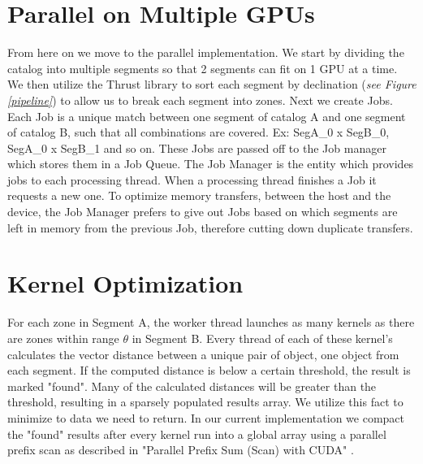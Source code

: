 \section{Parallel on Multiple GPUs}
From here on we move to the parallel implementation. We start by dividing the catalog into multiple segments so that 2 segments can fit on 1 GPU at a time. We then utilize the Thrust library to sort each segment by declination (\textit{see Figure \ref{pipeline}}) to allow us to break each segment into zones. Next we create Jobs. Each Job is a unique match between one segment of catalog A and one segment of catalog B, such that all combinations are covered. Ex: SegA\_0 x SegB\_0, SegA\_0 x SegB\_1 and so on. These Jobs are passed off to the Job manager which stores them in a Job Queue. The Job Manager is the entity which provides jobs to each processing thread. When a processing thread finishes a Job it requests a new one. To optimize memory transfers, between the host and the device, the Job Manager prefers to give out Jobs based on which segments are left in memory from the previous Job, therefore cutting down duplicate transfers.

\section{Kernel Optimization}
For each zone in Segment A, the worker thread launches as many kernels as there are zones within range $\theta$ in Segment B. Every thread of each of these kernel's calculates the vector distance between a unique pair of object, one object from each segment. If the computed distance is below a certain threshold, the result is marked "found". Many of the calculated distances will be greater than the threshold, resulting in a sparsely populated results array. We utilize this fact to minimize to data we need to return. In our current implementation we compact the "found" results after every kernel run into a global array using a parallel prefix scan as described in "Parallel Prefix Sum (Scan) with CUDA" \citet{harris2007parallel}.

